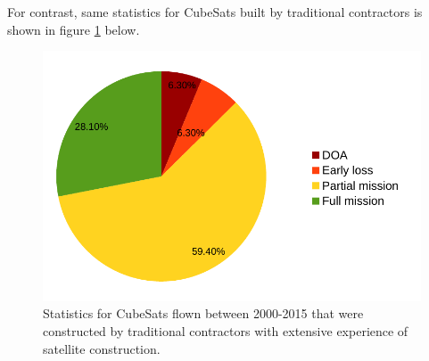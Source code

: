 \documentclass[english,12pt,a4paper,pdftex,elec,utf8]{aaltothesis}
\begin{document}
For contrast, same statistics for CubeSats built by traditional contractors is shown in figure \ref{tradiotionalflown2015pic} below. \par
\begin{figure}[h!]
\centering
\includegraphics[scale=0.5]{traditional2015}
\caption{Statistics for CubeSats flown between 2000-2015 that were constructed by traditional contractors with extensive experience of satellite construction. \cite{Swart2016}}
\label{tradiotionalflown2015pic}
\end{figure} 
\end{document}
